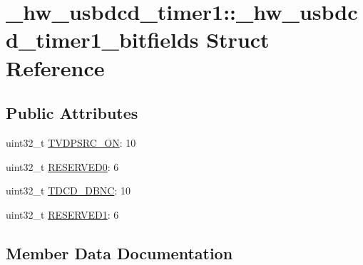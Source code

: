 \hypertarget{struct__hw__usbdcd__timer1_1_1__hw__usbdcd__timer1__bitfields}{}\section{\+\_\+hw\+\_\+usbdcd\+\_\+timer1\+:\+:\+\_\+hw\+\_\+usbdcd\+\_\+timer1\+\_\+bitfields Struct Reference}
\label{struct__hw__usbdcd__timer1_1_1__hw__usbdcd__timer1__bitfields}
\subsection*{Public Attributes}
\begin{DoxyCompactItemize}
\item 
uint32\+\_\+t \hyperlink{struct__hw__usbdcd__timer1_1_1__hw__usbdcd__timer1__bitfields_a140d1c6462e95b8503387c05ccbcfe0f}{T\+V\+D\+P\+S\+R\+C\+\_\+\+ON}\+: 10
\item 
uint32\+\_\+t \hyperlink{struct__hw__usbdcd__timer1_1_1__hw__usbdcd__timer1__bitfields_ac21b5ea4cefd6a0baa103cb7c6ab1021}{R\+E\+S\+E\+R\+V\+E\+D0}\+: 6
\item 
uint32\+\_\+t \hyperlink{struct__hw__usbdcd__timer1_1_1__hw__usbdcd__timer1__bitfields_a117a99fb7bfb7a03d9c14cc5aaf6afa7}{T\+D\+C\+D\+\_\+\+D\+B\+NC}\+: 10
\item 
uint32\+\_\+t \hyperlink{struct__hw__usbdcd__timer1_1_1__hw__usbdcd__timer1__bitfields_a3f3bcd41b0936073fbdc5cb4e594adab}{R\+E\+S\+E\+R\+V\+E\+D1}\+: 6
\end{DoxyCompactItemize}


\subsection{Member Data Documentation}
